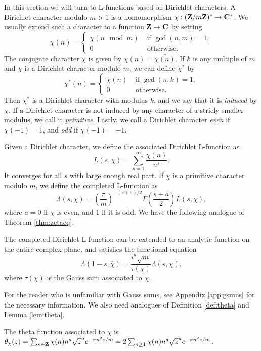 \documentclass{amsart}
\begin{document}
In this section we will turn to L-functions based on Dirichlet characters. A Dirichlet character modulo $m>1$ is a homomorphism $\chi: (\mathbf{Z}/m\mathbf{Z})^* \to \mathbf{C}^*$. We usually extend such a character to a function $\mathbf{Z} \to \mathbf{C}$ by setting
\[
\chi(n) = \begin{cases} \chi(n \mod m) &\text{ if } \gcd(n,m)=1, \\ 0 &\text{ otherwise.} \end{cases}
\]
The conjugate character $\bar\chi$ is given by $\bar\chi(n) = \bar{\chi(n)}$.
If $k$ is any multiple of $m$ and $\chi$ is a Dirichlet character modulo $m$, we can define $\chi^*$ by
\[
\chi^*(n) = \begin{cases} \chi(n) &\text{ if } \gcd(n,k)=1, \\ 0 &\text{ otherwise.} \end{cases}
\]
Then $\chi^*$ is a Dirichlet character with modulus $k$, and we say that it is \emph{induced} by $\chi$. If a Dirichlet character is not induced by any character of a stricly smaller modulus, we call it \emph{primitive}. Lastly, we call a Dirichlet character \emph{even} if $\chi(-1)=1$, and \emph{odd} if $\chi(-1)=-1$.

Given a Dirichlet character, we define the associated Dirichlet L-function as
\[L(s,\chi) = \sum_{n=1}^\infty \frac{\chi(n)}{n^s}. \]
It converges for all $s$ with large enough real part. If $\chi$ is a primitive character modulo $m$, we define the completed L-function as
\[\Lambda(s, \chi) = \left( \frac{\pi}{m} \right)^{-(s+a)/2}\Gamma \left( \frac{s+a}{2} \right)L(s,\chi), \]
where $a=0$ if $\chi$ is even, and $1$ if it is odd. We have the following analogue of Theorem \ref{thm:zetaeq}.

\begin{theorem}
\label{thm:dleq}
The completed Dirichlet L-function can be extended to an analytic function on the entire complex plane, and satisfies the functional equation
\[ \Lambda(1-s, \bar\chi) = \frac{i^a\sqrt{m}}{\tau(\chi)}\Lambda(s, \chi), \]
where $\tau(\chi)$ is the Gauss sum associated to $\chi$.
\end{theorem}
For the reader who is unfamiliar with Gauss sums, see Appendix \ref{app:gsums} for the necessary information.
We also need analogues of Definition \ref{def:theta} and Lemma \ref{lem:theta}.
\begin{defi}
  \label{def:theta2}
  The theta function associated to $\chi$ is $\theta_\chi(z) = \sum_{n\in \mathbf{Z}} \chi(n)n^a\sqrt{z}^ae^{-\pi n^2z/m} = 2 \sum_{n\geq 1 } \chi(n)n^a\sqrt{z}^ae^{-\pi n^2z/m}$.
\end{defi}
\end{document}
